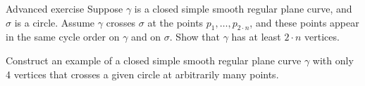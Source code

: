 \begin{thm}{Advanced exercise}\label{ex:curve-crosses-circle}
Suppose $\gamma$ is a closed simple smooth regular plane curve, and $\sigma$ is a circle.
Assume $\gamma$ crosses $\sigma$ at the points $p_1,\dots,p_{2{\cdot} n}$, and these points appear in the same cycle order on $\gamma$ and on $\sigma$.
Show that $\gamma$ has at least $2\cdot n$ vertices.

Construct an example of a closed simple smooth regular plane curve $\gamma$ with only 4 vertices that crosses a given circle at arbitrarily many points. 
\end{thm}




